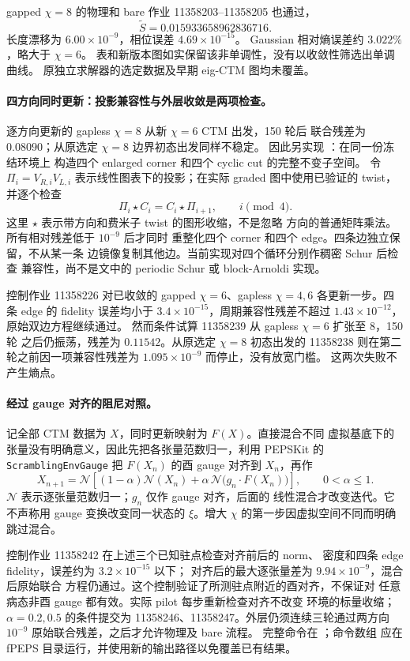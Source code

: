 gapped $\chi=8$ 的物理和 bare 作业 11358203--11358205 也通过，
\[
 \widetilde S=0.015933658962836716.
\]
长度漂移为 $6.00\times10^{-9}$，相位误差 $4.69\times10^{-15}$。
Gaussian 相对熵误差约 $3.022\%$，略大于 $\chi=6$。
表和新版本图如实保留该非单调性，没有以收敛性筛选出单调曲线。
原独立求解器的选定数据及早期 eig-CTM 图均未覆盖。

\paragraph{四方向同时更新：投影兼容性与外层收敛是两项检查。}
逐方向更新的 gapless $\chi=8$ 从新 $\chi=6$ CTM 出发，150 轮后
联合残差为 $0.08090$；从原选定 $\chi=8$ 边界初态出发同样不稳定。
因此另实现 ：在同一份冻结环境上
构造四个 enlarged corner 和四个 cyclic cut 的完整不变子空间。
令 $\Pi_i=V_{R,i}V_{L,i}$ 表示线性图表下的投影；在实际 graded
图中使用已验证的 twist，并逐个检查
\[
 \Pi_i\star C_i=C_i\star\Pi_{i+1},\qquad i\pmod4.
\]
这里 $\star$ 表示带方向和费米子 twist 的图形收缩，不是忽略
方向的普通矩阵乘法。所有相对残差低于 $10^{-9}$ 后才同时
重整化四个 corner 和四个 edge。四条边独立保留，不从某一条
边镜像复制其他边。当前实现对四个循环分别作稠密 Schur 后检查
兼容性，尚不是文中的 periodic Schur 或 block-Arnoldi 实现。

控制作业 11358226 对已收敛的 gapped $\chi=6$、gapless
$\chi=4,6$ 各更新一步。四条 edge 的 fidelity 误差均小于
$3.4\times10^{-15}$，周期兼容性残差不超过 $1.43\times10^{-12}$，
原始双边方程继续通过。
然而条件试算 11358239 从 gapless $\chi=6$ 扩张至 $8$，150 轮
之后仍振荡，残差为 $0.11542$。从原选定 $\chi=8$ 初态出发的
11358238 则在第二轮之前因一项兼容性残差为
$1.095\times10^{-9}$ 而停止，没有放宽门槛。
这两次失败不产生熵点。

\paragraph{经过 gauge 对齐的阻尼对照。}
记全部 CTM 数据为 $X$，同时更新映射为 $F(X)$。直接混合不同
虚拟基底下的张量没有明确意义，因此先把各张量范数归一，利用
PEPSKit 的 \texttt{ScramblingEnvGauge} 把 $F(X_n)$ 的酉 gauge
对齐到 $X_n$，再作
\[
 X_{n+1}=\mathcal N\!\left[(1-\alpha)\mathcal N(X_n)
       +\alpha\,\mathcal N\bigl(g_n\cdot F(X_n)\bigr)\right],
 \qquad 0<\alpha\leq1.
\]
$\mathcal N$ 表示逐张量范数归一；$g_n$ 仅作 gauge 对齐，后面的
线性混合才改变迭代。它不声称用 gauge 变换改变同一状态的
$\xi$。增大 $\chi$ 的第一步因虚拟空间不同而明确跳过混合。

控制作业 11358242 在上述三个已知驻点检查对齐前后的 norm、
密度和四条 edge fidelity，误差约为 $3.2\times10^{-15}$ 以下；
对齐后的最大逐张量差为 $9.94\times10^{-9}$，混合后原始联合
方程仍通过。这个控制验证了所测驻点附近的酉对齐，不保证对
任意病态非酉 gauge 都有效。实际 pilot 每步重新检查对齐不改变
环境的标量收缩；$\alpha=0.2,0.5$ 的条件提交为
11358246、11358247。外层仍须连续三轮通过两方向 $10^{-9}$
原始联合残差，之后才允许物理及 bare 流程。
完整命令在 ；命令数组
应在 fPEPS 目录运行，并使用新的输出路径以免覆盖已有结果。


